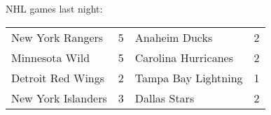 NHL games last night:
\begin{tabular}{llll}
\toprule
  New York Rangers & 5 &       Anaheim Ducks & 2 \\
    Minnesota Wild & 5 & Carolina Hurricanes & 2 \\
 Detroit Red Wings & 2 & Tampa Bay Lightning & 1 \\
New York Islanders & 3 &        Dallas Stars & 2 \\
\bottomrule
\end{tabular}
